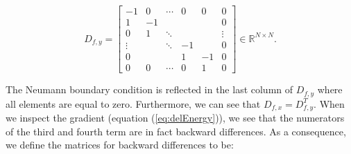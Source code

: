 \documentclass{paper}
\begin{document}
\begin{equation}
D_{f,y}=
\begin{bmatrix}
  -1 & 0 & \cdots & 0 &0 &0 \\
  1 & -1 & &  & & 0\\
  0  & 1 & \ddots & & &\vdots\\
   \vdots &  & \ddots & -1 & &0 \\  
   0 &  &  & 1 &-1 &0 \\
  0 & 0 & \cdots & 0 &1 &0
\end{bmatrix}\in\mathbb{R}^{N\times N}.
\label{eq:Dfy}
\end{equation}

The Neumann boundary condition is reflected in the last column of \begin{math}D_{f,y}\end{math} where all elements are equal to zero. Furthermore, we can see that \begin{math}D_{f,x}=D_{f,y}^{T}\end{math}. When we inspect the gradient (equation (\ref{eq:delEnergy})), we see that the numerators of the third and fourth term are in fact backward differences. As a consequence, we define the matrices for backward differences to be:
\end{document}
